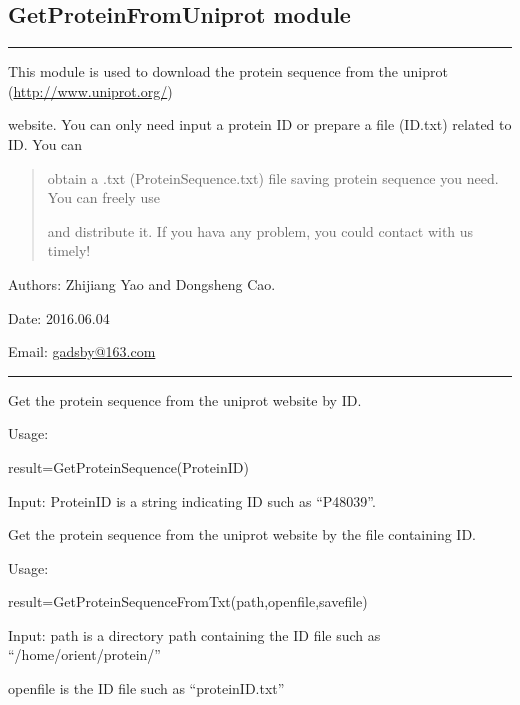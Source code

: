 \documentclass[letterpaper,10pt,english]{sphinxmanual}
\begin{document}
\subsection{GetProteinFromUniprot module}
\label{reference/GetProteinFromUniprot:module-GetProteinFromUniprot}\label{reference/GetProteinFromUniprot:getproteinfromuniprot-module}\label{reference/GetProteinFromUniprot::doc}

\bigskip\hrule{}\bigskip


This module is used to download the protein sequence from the uniprot (\url{http://www.uniprot.org/})

website. You can only need input a protein ID or prepare a file (ID.txt) related to ID. You can
\begin{quote}

obtain a .txt (ProteinSequence.txt) file saving protein sequence you need.  You can freely use

and distribute it. If you hava  any problem, you could contact with us timely!
\end{quote}

Authors: Zhijiang Yao and Dongsheng Cao.

Date: 2016.06.04

Email: \href{mailto:gadsby@163.com}{gadsby@163.com}


\bigskip\hrule{}\bigskip


\begin{fulllineitems}
\label{reference/GetProteinFromUniprot:GetProteinFromUniprot.GetProteinSequence}
Get the protein sequence from the uniprot website by ID.

Usage:

result=GetProteinSequence(ProteinID)

Input: ProteinID is a string indicating ID such as ``P48039''.

\end{fulllineitems}


\begin{fulllineitems}
\label{reference/GetProteinFromUniprot:GetProteinFromUniprot.GetProteinSequenceFromTxt}
Get the protein sequence from the uniprot website by the file containing ID.

Usage:

result=GetProteinSequenceFromTxt(path,openfile,savefile)

Input: path is a directory path containing the ID file such as ``/home/orient/protein/''

openfile is the ID file such as ``proteinID.txt''

\end{fulllineitems}
\end{document}
